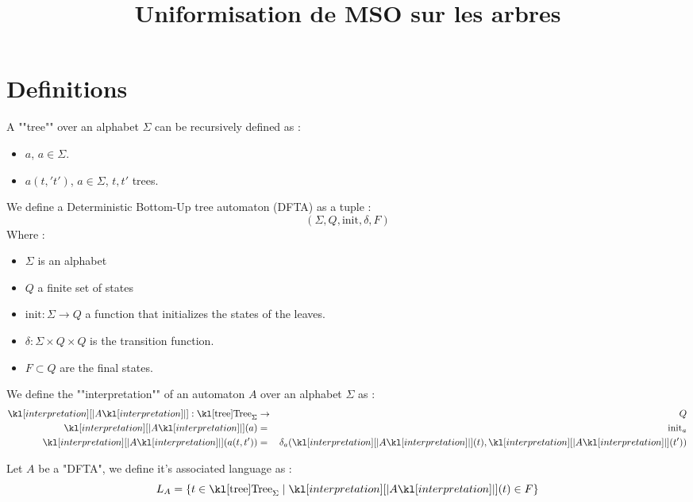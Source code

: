 \documentclass{article}
\begin{document}
\title{Uniformisation de MSO sur les arbres}

\maketitle

\section{Definitions}


\begin{definition}[Tree]
	A ""tree"" over an alphabet $\Sigma$ can be recursively defined as :
	\begin{itemize}
		\item $a$, $a \in \Sigma$.
		\item $a(t,'t')$, $a \in \Sigma$, $t,t'$ trees.
	\end{itemize}
\end{definition}

\begin{definition}
	We define a Deterministic Bottom-Up tree automaton (DFTA) as a tuple :
	$$ (\Sigma, Q, \text{init}, \delta, F) $$
	Where :
	\begin{itemize}
		\item $\Sigma$ is an alphabet
		\item $Q$ a finite set of states
		\item $\text{init} : \Sigma \to  Q$ a function that initializes the states of the leaves.
		\item $\delta: \Sigma \times Q \times Q$ is the transition function.
		\item $F \subset Q$ are the final states.
	\end{itemize}
\end{definition}

\begin{definition}
	We define the ""interpretation"" of an automaton $A$ over an alphabet $\Sigma$ as :
	\begin{eqnarray*}
		\interpret A : \tree_{\Sigma} &\to& Q \\
		\interpret A (a) &=& \text{init}_a \\
		\interpret A (a(t,t')) &=& \delta_a (\interpret A (t), \interpret A (t') )
	\end{eqnarray*}
\end{definition}

\begin{definition}
	Let $A$ be a "DFTA", we define it's associated language as :
	$$L_A = \setdef {t \in \tree_{\Sigma}} {\interpret A (t) \in F}$$

\end{definition}



\end{document}
